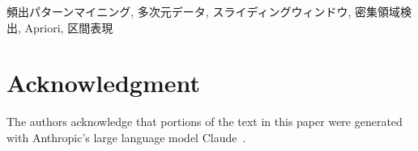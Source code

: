 \documentclass[conference]{IEEEtran}
\begin{document}
\begin{IEEEkeywords}
頻出パターンマイニング, 多次元データ, スライディングウィンドウ,
密集領域検出, Apriori, 区間表現
\end{IEEEkeywords}








\section*{Acknowledgment}
The authors acknowledge that portions of the text in
this paper were generated with Anthropic's large language
model Claude~\cite{claude2025}.

\newpage



\clearpage
\appendices

\end{document}
